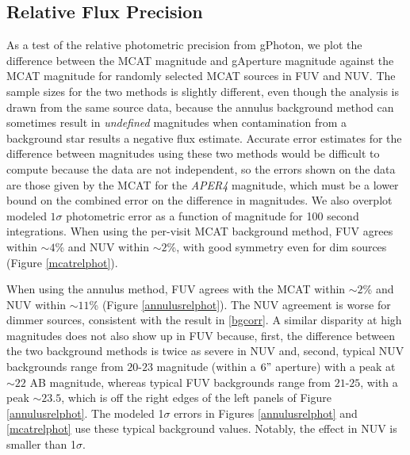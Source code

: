 \documentclass[preprint]{aastex}
\begin{document}
\subsection{Relative Flux Precision}
\label{relflux}
As a test of the relative photometric precision from gPhoton, we plot the difference between the MCAT magnitude and gAperture magnitude against the MCAT magnitude for randomly selected MCAT sources in FUV and NUV. The sample sizes for the two methods is slightly different, even though the analysis is drawn from the same source data, because the annulus background method can sometimes result in \emph{undefined} magnitudes when contamination from a background star results a negative flux estimate. Accurate error estimates for the difference between magnitudes using these two methods would be difficult to compute because the data are not independent, so the errors shown on the data are those given by the MCAT for the \emph{APER4} magnitude, which must be a lower bound on the combined error on the difference in magnitudes. We also overplot modeled $1\sigma$ photometric error as a function of magnitude for 100 second integrations. When using the per-visit MCAT background method, FUV agrees within $\sim 4$\% and NUV within $\sim 2$\%, with good symmetry even for dim sources (Figure \ref{mcatrelphot}).

When using the annulus method, FUV agrees with the MCAT within $\sim 2$\% and NUV within $\sim 11$\% (Figure \ref{annulusrelphot}). The NUV agreement is worse for dimmer sources, consistent with the result in \ref{bgcorr}. A similar disparity at high magnitudes does not also show up in FUV because, first, the difference between the two background methods is twice as severe in NUV and, second, typical NUV backgrounds range from $20$-$23$ magnitude (within a $6"$ aperture) with a peak at $\sim 22$ AB magnitude, whereas typical FUV backgrounds range from $21$-$25$, with a peak $\sim 23.5$, which is off the right edges of the left panels of Figure \ref{annulusrelphot}. The modeled 1$\sigma$ errors in Figures \ref{annulusrelphot} and \ref{mcatrelphot} use these typical background values. Notably, the effect in NUV is smaller than 1$\sigma$.
\end{document}
